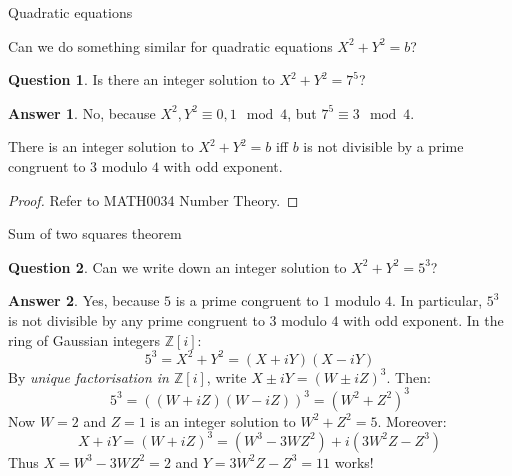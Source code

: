 \documentclass[10pt]{beamer}
\theoremstyle{definition}
\newtheorem{answer}{Answer}
\newtheorem{question}{Question}
\begin{document}
\begin{frame}[t]{Quadratic equations}

Can we do something similar for quadratic equations $ X^2 + Y^2 = b $?

\vspace{0.5cm}

\begin{question}
Is there an integer solution to $ X^2 + Y^2 = 7^5 $?
\end{question}

\begin{answer}
No, because $ X^2, Y^2 \equiv 0, 1 \mod 4 $, but $ 7^5 \equiv 3 \mod 4 $.
\end{answer}

\vspace{0.5cm}

\begin{theorem}
There is an integer solution to $ X^2 + Y^2 = b $ iff $ b $ is not divisible by a prime congruent to $ 3 $ modulo $ 4 $ with odd exponent.
\end{theorem}

\begin{proof}
Refer to MATH0034 Number Theory.
\end{proof}

\end{frame}

\begin{frame}[t]{Sum of two squares theorem}

\begin{question}
Can we write down an integer solution to $ X^2 + Y^2 = 5^3 $?
\end{question}

\begin{answer}
Yes, because $ 5 $ is a prime congruent to $ 1 $ modulo $ 4 $. In particular, $ 5^3 $ is not divisible by any prime congruent to $ 3 $ modulo $ 4 $ with odd exponent. In the ring of Gaussian integers $ \mathbb{Z}[i] $:
$$ 5^3 = X^2 + Y^2 = (X + iY)(X - iY) $$
By \emph{unique factorisation in $ \mathbb{Z}[i] $}, write $ X \pm iY = (W \pm iZ)^3 $. Then:
$$ 5^3 = ((W + iZ)(W - iZ))^3 = (W^2 + Z^2)^3 $$
Now $ W = 2 $ and $ Z = 1 $ is an integer solution to $ W^2 + Z^2 = 5 $. Moreover:
$$ X + iY = (W + iZ)^3 = (W^3 - 3WZ^2) + i(3W^2Z - Z^3) $$
Thus $ X = W^3 - 3WZ^2 = 2 $ and $ Y = 3W^2Z - Z^3 = 11 $ works!
\end{answer}

\end{frame}
\end{document}
